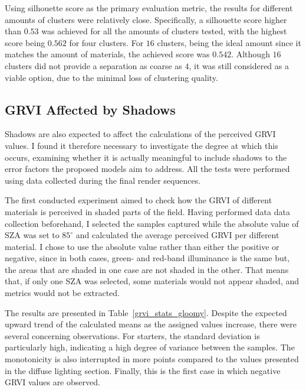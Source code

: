 Using silhouette score as the primary evaluation metric, the results for different amounts of clusters were relatively close. Specifically, a silhouette score higher than $0.53$ was achieved for all the amounts of clusters tested, with the highest score being $0.562$ for four clusters. For $16$ clusters, being the ideal amount since it matches the amount of materials, the achieved score was $0.542$. Although $16$ clusters did not provide a separation as coarse as $4$, it was still considered as a viable option, due to the minimal loss of clustering quality. 

\subsection{GRVI Affected by Shadows}
\label{shadows-aff-grvi}


Shadows are also expected to affect the calculations of the perceived GRVI values. I found it therefore necessary to investigate the degree at which this occurs, examining whether it is actually meaningful to include shadows to the error factors the proposed models aim to address. All the tests were performed using data collected during the final render sequences.

The first conducted experiment aimed to check how the GRVI of different materials is perceived in shaded parts of the field. Having performed data data collection beforehand, I selected the samples captured while the absolute value of SZA was set to $85^\circ$ and calculated the average perceived GRVI per different material. I chose to use the absolute value rather than either the positive or negative, since in both cases, green- and red-band illuminance is the same but, the areas that are shaded in one case are not shaded in the other. That means that, if only one SZA was selected, some materials would not appear shaded, and metrics would not be extracted. 

The results are presented in Table~\ref{grvi_stats_gloomy}. Despite the expected upward trend of the calculated means as the assigned values increase, there were several concerning observations. For starters, the standard deviation is particularly high, indicating a high degree of variance between the samples. The monotonicity is also interrupted in more points compared to the values presented in the diffuse lighting section. Finally, this is the first case in which negative GRVI values are observed. 


